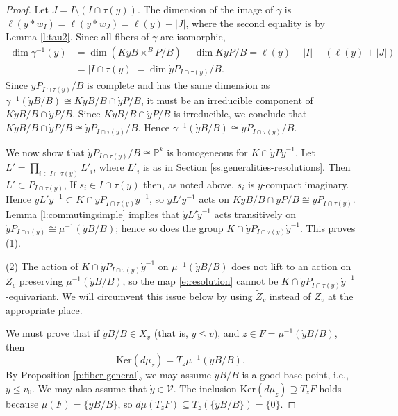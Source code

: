 \documentclass[11pt,letterpaper,reqno]{amsart}
\numberwithin{equation}{section}
\theoremstyle{plain}
\theoremstyle{definition}
\theoremstyle{remark}
\begin{document}
\begin{proof}
Let $J = I \setminus (I \cap \tau(y) )$.  The dimension of the image of $\gamma$ is
$\ell(y * w_I) = \ell(y*w_J) = \ell(y) + |J|$, where the second equality is by Lemma \ref{l:tau2}.  Since all fibers of $\gamma$ are isomorphic,
\begin{align*}
\dim \gamma^{-1}(y) & = \dim (K \dot{y}B \times^B P/B ) - \dim K\dot{y}P/B = \ell(y) + |I | - (\ell(y) + |J |) \\
& = |I \cap \tau(y)| = \dim \dot{y}P_{I \cap \tau(y) }/B.
\end{align*}
Since $\dot{y}P_{I \cap \tau(y) }/B$ is complete and has the same dimension as $ \gamma^{-1}(\dot{y}B/B) \cong K\dot{y}B/B \cap \dot{y}P/B$, it must be an irreducible component of $K\dot{y}B/B \cap \dot{y}P/B$.
Since $K\dot{y}B/B \cap \dot{y}P/B$ is irreducible, we conclude that $K\dot{y}B/B \cap \dot{y}P/B \cong  \dot{y}P_{I \cap \tau(y) }/B$.  Hence $\gamma^{-1}(\dot{y}B/B) \cong \dot{y}P_{I \cap \tau(y) }/B$.

We now show that $\dot{y}P_{I \cap \tau(y) }/B \cong {\mathbb P}^k$ is homogeneous for $K\cap \dot{y}P \dot{y}^{-1}$.  
Let $L' =  \prod_{i \in I \cap \tau(y) } L'_i $,  where $L'_i $ is as in
Section \ref{ss.generalities-resolutions}.
Then $L' \subset P_{I \cap \tau(y)}$,
If $s_i \in I \cap \tau(y) $ then, as noted above, $s_i$ is $y$-compact imaginary.
Hence 
$ \dot{y} L' \dot{y}^{-1}  \subset K \cap \dot{y} P_{I \cap \tau(y)}\dot{y}^{-1}$, so
$yL'y^{-1}$ acts
on $K\dot{y}B/B \cap \dot{y} P/B \cong \dot{y} P_{I \cap \tau(y)}$.  Lemma \ref{l:commutingsimple} implies that $\dot{y} L' \dot{y}^{-1}$ acts transitively on
$\dot{y} P_{I \cap \tau(y)} \cong  \mu^{-1}(\dot{y}B/B)$; hence so does the group $K \cap \dot{y} P_{I \cap \tau(y)} \dot{y}^{-1}$.  This proves (1).


(2) The action of $K \cap \dot{y} P_{I \cap \tau(y)} \dot{y}^{-1}$ on $\mu^{-1}(\dot{y}B/B)$ does not lift
to an action on $Z_v$ preserving $\mu^{-1}(\dot{y}B/B)$, so the map \eqref{e:resolution} cannot be
$K \cap \dot{y} P_{I \cap \tau(y)} \dot{y}^{-1}$-equivariant.  
We will circumvent this issue below by using $\widetilde{Z}_v$ instead of $Z_v$ at the
appropriate place.

We must prove that if $\dot{y}B/B \in X_v$ (that is, $y \leq v$),
and $z \in F = \mu^{-1} (\dot{y}B/B)$, then
\begin{equation} \label{e:kernel-deriv}
\mathrm{Ker}(d\mu_z)=T_z\mu^{-1}(\dot{y}B/B).
\end{equation}
By Proposition \ref{p:fiber-general},
we may assume $\dot{y}B/B$ is a good base point, i.e., 
$y \leq v_0$.  We may also assume that $\dot{y} \in \mathcal{V}$.  
The inclusion $\mathrm{Ker}(d\mu_z) \supseteq T_z F$ holds 
because
$\mu(F) = \{ \dot{y}B/B \}$, so $d\mu (T_z F) \subseteq T_z (\{ \dot{y}B/B \}) = \{ 0 \}$.  


\end{proof}
\end{document}
